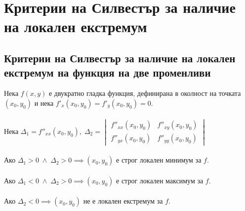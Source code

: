 \documentclass[14pt]{extarticle}
\begin{document}
\section*{Критерии на Силвестър за наличие на локален екстремум}
\subsection*{Критерии на Силвестър за наличие на локален екстремум на функция на две променливи}
Нека \(f(x,y)\) е двукратно гладка функция, дефинирана в околност на точката \((x_0,y_0)\) и нека \(f'_x(x_0, y_0) = f'_y(x_0,y_0) = 0\). \\\\
Нека \(\Delta_1 = f''_{xx}(x_0, y_0), \; \Delta_2 = \begin{vmatrix}
    f''_{xx}(x_0, y_0) & f''_{xy}(x_0, y_0) \\
    f''_{yx}(x_0, y_0) & f''_{yy}(x_0, y_0)
\end{vmatrix} \) \\\\
Ако \(\Delta_1 > 0 \; \land \; \Delta_2 > 0 \implies (x_0, y_0)\) е строг локален минимум за \(f\). \\\\
Ако \(\Delta_1 < 0 \; \land \; \Delta_2 > 0 \implies (x_0, y_0)\) е строг локален максимум за \(f\). \\\\
Ако \(\Delta_2 < 0 \implies (x_0, y_0)\) не е локален екстремум за \(f\).
\end{document}
